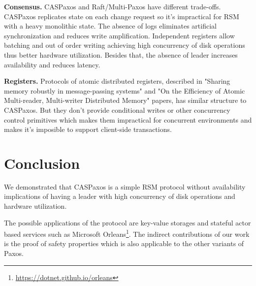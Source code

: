 \documentclass[a4paper,USenglish]{lipics-v2018}
\theoremstyle{definition}
\begin{document}
    {\bf Consensus.} CASPaxos and Raft/Multi-Paxos have different trade-offs. CASPaxos replicates state on each change request so it's impractical for RSM with a heavy monolithic state. The absence of logs eliminates artificial synchronization and reduces write amplification. Independent registers allow batching and out of order writing achieving high concurrency of disk operations thus better hardware utilization. Besides that, the absence of leader increases availability and reduces latency.

    {\bf Registers.} Protocols of atomic distributed registers, described in "Sharing memory robustly in message-passing systems"\cite{abd} and "On the Efficiency of Atomic Multi-reader, Multi-writer Distributed Memory"\cite{mwmr} papers, has similar structure to CASPaxos. But they don't provide conditional writes or other concurrency control primitives which makes them impractical for concurrent environments and makes it's imposible to support client-side transactions.

\section{Conclusion}

    We demonstrated that CASPaxos is a simple RSM protocol without availability implications of having a leader with high concurrency of disk operations and hardware utilization.

    The possible applications of the protocol are key-value storages and stateful actor based services such as Microsoft Orleans\footnote{\href{https://dotnet.github.io/orleans}{https://dotnet.github.io/orleans}}. The indirect contributions of our work is the proof of safety properties which is also applicable to the other variants of Paxos.

    \newpage

    

    \newpage
\end{document}
